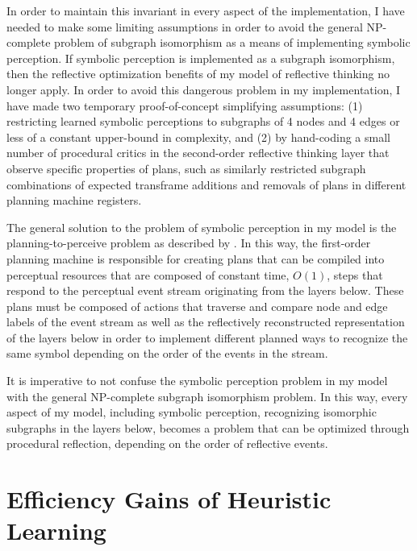 In order to maintain this invariant in every aspect of the
implementation, I have needed to make some limiting assumptions in
order to avoid the general NP-complete problem of subgraph isomorphism
as a means of implementing symbolic perception.  If symbolic
perception is implemented as a subgraph isomorphism, then the
reflective optimization benefits of my model of reflective thinking no
longer apply.  In order to avoid this dangerous problem in my
implementation, I have made two temporary proof-of-concept simplifying
assumptions: (1) restricting learned symbolic perceptions to subgraphs
of 4 nodes and 4 edges or less of a constant upper-bound in
complexity, and (2) by hand-coding a small number of procedural
critics in the second-order reflective thinking layer that observe
specific properties of plans, such as similarly restricted subgraph
combinations of expected transframe additions and removals of plans in
different planning machine registers.

The general solution to the problem of symbolic perception in my model
is the planning-to-perceive problem as described by
\cite{pryorcollins:1995}.  In this way, the first-order planning
machine is responsible for creating plans that can be compiled into
perceptual resources that are composed of constant time, $O(1)$, steps
that respond to the perceptual event stream originating from the
layers below.  These plans must be composed of actions that traverse
and compare node and edge labels of the event stream as well as the
reflectively reconstructed representation of the layers below in order
to implement different planned ways to recognize the same symbol
depending on the order of the events in the stream.

It is imperative to not confuse the symbolic perception problem in my
model with the general NP-complete subgraph isomorphism problem.  In
this way, every aspect of my model, including symbolic perception,
recognizing isomorphic subgraphs in the layers below, becomes a
problem that can be optimized through procedural reflection, depending
on the order of reflective events.

\section{Efficiency Gains of Heuristic Learning}

